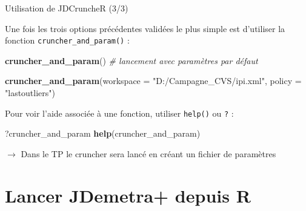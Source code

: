 \documentclass[10pt,xcolor=table,color={dvipsnames,usenames},ignorenonframetext,usepdftitle=false,french]{beamer}
\newenvironment{Shaded}{\begin{snugshade}}{\end{snugshade}}
\newcommand{\CommentTok}[1]{\textcolor[rgb]{0.56,0.35,0.01}{\textit{#1}}}
\newcommand{\DataTypeTok}[1]{\textcolor[rgb]{0.13,0.29,0.53}{#1}}
\newcommand{\KeywordTok}[1]{\textcolor[rgb]{0.13,0.29,0.53}{\textbf{#1}}}
\newcommand{\NormalTok}[1]{#1}
\newcommand{\StringTok}[1]{\textcolor[rgb]{0.31,0.60,0.02}{#1}}
\begin{document}
\begin{frame}[fragile]{Utilisation de JDCruncheR (3/3)}
\protect\hypertarget{utilisation-de-jdcruncher-33}{}

Une fois les trois options précédentes validées le plus simple est
d'utiliser la fonction \texttt{cruncher\_and\_param()} :

\begin{Shaded}
\begin{Highlighting}[]
\KeywordTok{cruncher_and_param}\NormalTok{() }\CommentTok{# lancement avec paramètres par défaut}

\KeywordTok{cruncher_and_param}\NormalTok{(}\DataTypeTok{workspace =} \StringTok{"D:/Campagne_CVS/ipi.xml"}\NormalTok{,}
                   \DataTypeTok{policy =} \StringTok{"lastoutliers"}\NormalTok{)}
\end{Highlighting}
\end{Shaded}

Pour voir l'aide associée à une fonction, utiliser \texttt{help()} ou
\texttt{?} :

\begin{Shaded}
\begin{Highlighting}[]
\NormalTok{?cruncher_and_param}
\KeywordTok{help}\NormalTok{(cruncher_and_param)}
\end{Highlighting}
\end{Shaded}

\(\longrightarrow\) Dans le TP le cruncher sera lancé en créant un
fichier de paramètres

\end{frame}

\hypertarget{lancer-jdemetra-depuis-r}{%
\section{Lancer JDemetra+ depuis R}\label{lancer-jdemetra-depuis-r}}
\end{document}
